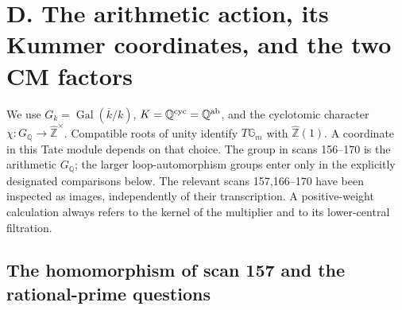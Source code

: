 \section{D. The arithmetic action, its Kummer coordinates, and the two CM factors}
\label{sec:D}

We use $G_k=\operatorname{Gal}(\overline k/k)$, $K=\mathbb Q^{\rm cyc}=\mathbb Q^{\rm ab}$, and the cyclotomic character $\chi:G_{\mathbb Q}\to\widehat{\mathbb Z}^{\times}$. Compatible roots of unity identify $T\mathbb G_m$ with $\widehat{\mathbb Z}(1)$. A coordinate in this Tate module depends on that choice. The group in scans 156--170 is the arithmetic $G_{\mathbb Q}$; the larger loop-automorphism groups enter only in the explicitly designated comparisons below. The relevant scans 157,166--170 have been inspected as images, independently of their transcription. A positive-weight calculation always refers to the kernel of the multiplier and to its lower-central filtration.

\subsection{The homomorphism of scan 157 and the rational-prime questions}

